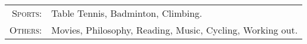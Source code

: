 %
%



\begin{tabular}{rl}
    \textsc{Sports:} & Table Tennis, Badminton, Climbing.\\
    \textsc{Others:} & Movies, Philosophy, Reading, Music, Cycling, Working out.\\ 
\end{tabular}